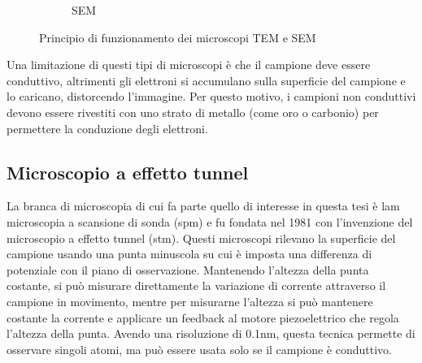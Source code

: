 \documentclass[../main.tex]{subfiles}
\begin{document}
\begin{figure}[htbp]
\begin{subfigure}[t]{5cm}
	\caption{SEM}
\end{subfigure}%
\caption{Principio di funzionamento dei microscopi TEM e SEM}
\label{fig:em_diag}
\end{figure}

Una limitazione di questi tipi di microscopi è che il campione deve essere conduttivo, altrimenti gli elettroni si accumulano sulla superficie del campione e lo caricano, distorcendo l'immagine. Per questo motivo, i campioni non conduttivi devono essere rivestiti con uno strato di metallo (come oro o carbonio) per permettere la conduzione degli elettroni.


\subsection{Microscopio a effetto tunnel}

La branca di microscopia di cui fa parte quello di interesse in questa tesi è lam microscopia a scansione di sonda (\acrshort{spm}) e fu fondata nel 1981 con l'invenzione del microscopio a effetto tunnel (\acrshort{stm}).\cite{ieee_spm}
Questi microscopi rilevano la superficie del campione usando una punta minuscola su cui è imposta una differenza di potenziale con il piano di osservazione. Mantenendo l'altezza della punta costante, si può misurare direttamente la variazione di corrente attraverso il campione in movimento, mentre per misurarne l'altezza si può mantenere costante la corrente e applicare un feedback al motore piezoelettrico che regola l'altezza della punta. Avendo una risoluzione di 0.1nm, questa tecnica permette di osservare singoli atomi, ma può essere usata solo se il campione è conduttivo.\cite{bai_2000}
\end{document}
